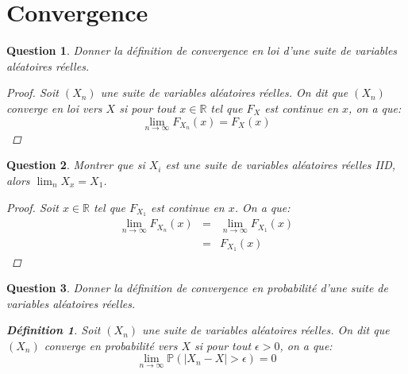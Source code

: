 \documentclass{article}
\theoremstyle{plain}
\newtheorem{question}{Question}
\theoremstyle{definition}
\newtheorem{definition}{Définition}
\begin{document}
\section{Convergence}

\begin{question}
	Donner la définition de convergence en loi d'une suite de variables aléatoires réelles.
	\begin{proof}
		Soit $(X_n)$ une suite de variables aléatoires réelles. On dit que $(X_n)$ converge en loi vers $X$ si pour tout $x \in \mathbb{R}$ tel que $F_X$ est continue en $x$, on a que:
		\begin{equation*}
			\lim_{n \to \infty} F_{X_n} (x) = F_X (x)
		\end{equation*}
	\end{proof}

\end{question}

\begin{question}
	Montrer que si $X_i$ est une suite de variables aléatoires réelles IID, alors $\lim_n X_x = X_1$.
	\begin{proof}
		Soit $x \in \mathbb{R}$ tel que $F_{X_1}$ est continue en $x$. On a que:
		\begin{eqnarray*}
			\lim_{n \to \infty} F_{X_n} (x) &=& \lim_{n \to \infty} F_{X_1} (x) \\
			&=& F_{X_1} (x)
		\end{eqnarray*}
	\end{proof}
\end{question}


\begin{question}
	Donner la définition de convergence en probabilité d'une suite de variables aléatoires réelles.
	\begin{definition}
		Soit $(X_n)$ une suite de variables aléatoires réelles. On dit que $(X_n)$ converge en probabilité vers $X$ si pour tout $\epsilon > 0$, on a que:
		\begin{equation*}
			\lim_{n \to \infty} \mathbb{P} (|X_n - X| > \epsilon) = 0
		\end{equation*}
	\end{definition}
\end{question}
\end{document}
